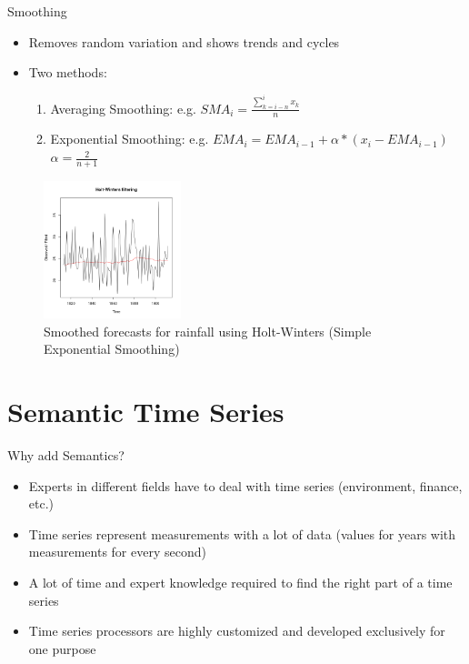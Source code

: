 \documentclass{beamer}
\begin{document}
\begin{frame}{Smoothing}
\begin{itemize}
\item Removes random variation and shows trends and cycles
\item Two methods:
\begin{enumerate}
\item Averaging Smoothing: e.g. $SMA_i = \frac{\sum_{k=i-n}^{i}x_k}{n}$
\item Exponential Smoothing: e.g. $EMA_i = EMA_{i-1} + \alpha * (x_i - EMA_{i-1})$ \\ $\alpha = \frac{2}{n+1} $
\end{enumerate}
\end{itemize}
\begin{figure}
\centering
\includegraphics[width=4cm]{holt-winters}
\caption{Smoothed forecasts for rainfall using Holt-Winters (Simple Exponential Smoothing)}
\end{figure}
\end{frame}

\section{Semantic Time Series}
\begin{frame}{Why add Semantics?}
\begin{itemize}
\item Experts in different fields have to deal with time series (environment,
finance, etc.)
\item Time series represent measurements with a lot of data (values for
years with measurements for every second)
\item A lot of time and expert knowledge required to find the right part of a
time series
\item Time series processors are highly customized and developed
exclusively for one purpose
\end{itemize}
\end{frame}
\end{document}
